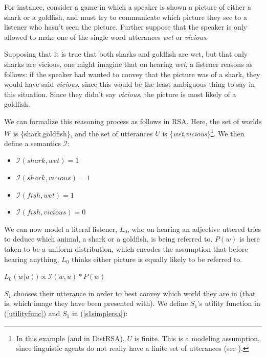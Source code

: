 \documentclass[10pt,letterpaper,twocolumn]{article}
\begin{document}
For instance, consider a game in which a speaker is shown a picture of either a shark or a goldfish, and must try to communicate which picture they see to a listener who hasn't seen the picture. Further suppose that the speaker is only allowed to make one of the single word utterances \emph{wet} or \emph{vicious}.

Supposing that it is true that both sharks and goldfish are wet, but that only sharks are vicious, one might imagine that on hearing \emph{wet}, a listener reasons as follows: if the speaker had wanted to convey that the picture was of a shark, they would have said \emph{vicious}, since this would be the least ambiguous thing to say in this situation. Since they didn't say \emph{vicious}, the picture is most likely of a goldfish.

We can formalize this reasoning process as follows in RSA. Here, the set of worlds $W$ is \{shark,goldfish\}, and the set of utterances $U$ is \{\emph{wet},\emph{vicious}\}\footnote{In this example (and in DistRSA), $U$ is finite. This is a modeling assumption, since linguistic agents do not really have a finite set of utterances (see \cite{chomsky2002syntactic}).}. We then define a semantics $\mathcal{I}$:

\begin{itemize}
\item $\mathcal{I}(\mathit{shark},\mathit{wet}) = 1$
\item $\mathcal{I}(\mathit{shark},\mathit{vicious}) = 1$
\item $\mathcal{I}(\mathit{fish},\mathit{wet}) = 1$
\item $\mathcal{I}(\mathit{fish},\mathit{vicious}) = 0$
\end{itemize}

We can now model a literal listener, $L_0$, who on hearing an adjective uttered tries to deduce which animal, a shark or a goldfish, is being referred to. $P(w)$ is here taken to be a uniform distribution, which encodes the assumption that before hearing anything, $L_0$ thinks either picture is equally likely to be referred to.

\begin{exe}
\ex $L_0(w\vert u)) \propto \mathcal{I}(w,u) * P(w)$ \label{simplelzero}
\end{exe}


$S_1$ chooses their utterance in order to best convey which world they are in (that is, which image they have been presented with). We define $S_1$'s utility function in (\ref{utilityfunc}) and $S_1$ in (\ref{s1simplersa}):
\end{document}
